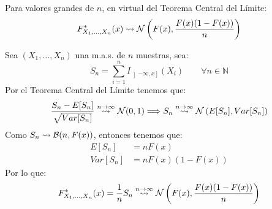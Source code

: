 \begin{ejemplo}
    Para valores grandes de $n$, en virtual del Teorema Central del Límite:
    \begin{equation*}
        F_{X_1, \ldots, X_n}^\ast (x) \rightsquigarrow \mathcal{N}\left(F(x), \dfrac{F(x)(1-F(x))}{n}\right)
    \end{equation*}

    \noindent
    Sea $(X_1, \ldots, X_n)$ una m.a.s. de $n$ muestras, sea:
    \begin{equation*}
        S_n = \sum\limits_{i=1}^{n} I_{\left]-\infty,x\right]}(X_i) \qquad \forall n\in \mathbb{N}
    \end{equation*}
    Por el Teorema Central del Límite tenemos que:
    \begin{equation*}
        \dfrac{S_n - E[S_n]}{\sqrt{Var[S_n]}} \stackrel{n\to \infty}{\rightsquigarrow} \mathcal{N}(0,1) \Longrightarrow S_n \stackrel{n\to \infty}{\rightsquigarrow} \mathcal{N}\left(E[S_n], Var[S_n]\right)
    \end{equation*}
    Como $S_n \rightsquigarrow \mathcal{B}(n,F(x))$, entonces tenemos que:
    \begin{align*}
        E[S_n] &= nF(x) \\
        Var[S_n] &= nF(x)(1-F(x))
    \end{align*}
    Por lo que:
    \begin{equation*}
        F_{X_1, \ldots, X_n}^\ast (x) = \dfrac{1}{n}S_n \stackrel{n\to \infty}{\rightsquigarrow} \mathcal{N}\left(F(x), \dfrac{F(x)(1-F(x))}{n}\right)
    \end{equation*}
\end{ejemplo}

